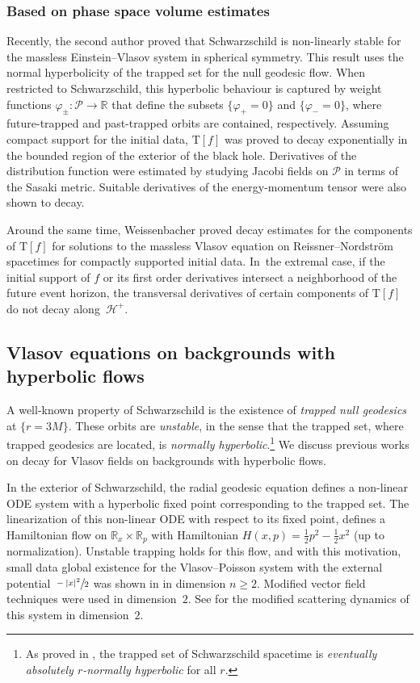 \documentclass[10pt]{amsart}
\theoremstyle{plain}
\theoremstyle{definition}
\newcommand\R{{\mathbb{R}}}
\renewcommand\H{{\mathcal{H}^+}}
\begin{document}
\subsubsection{Based on phase space volume estimates} Recently, the second author \cite{VR23} proved that Schwarzschild is non-linearly stable for the massless Einstein--Vlasov system in spherical symmetry. This result uses the normal hyperbolicity of the trapped set for the null geodesic flow. When restricted to Schwarzschild, this hyperbolic behaviour is captured by weight functions $\varphi_{\pm}\colon \mathcal{P}\to \R$ that define the subsets $\{\varphi_{+}=0\}$ and $\{\varphi_{-}=0\}$, where future-trapped and past-trapped orbits are contained, respectively. Assuming compact support for the initial data, $\mathrm{T}[f]$ was proved to decay exponentially in the bounded region of the exterior of the black hole. Derivatives of the distribution function were estimated by studying Jacobi fields on $\mathcal{P}$ in terms of the Sasaki metric. Suitable derivatives of the energy-momentum tensor were also shown to decay.

Around the same time, Weissenbacher \cite{W23} proved decay estimates for the components of $\mathrm{T}[f]$ for solutions to the massless Vlasov equation on Reissner--Nordström spacetimes for compactly supported initial data. In~the extremal case, if the initial support of $f$ or its first order derivatives intersect a neighborhood of the future event horizon, the transversal derivatives of certain components of $\mathrm{T}[f]$ do not decay along~$\H$.

\subsection{Vlasov equations on backgrounds with hyperbolic flows}

A well-known property of Schwarzschild is the existence of \emph{trapped null geodesics} at $\{r=3M\}$. These orbits are \emph{unstable}, in the sense that the trapped set, where trapped geodesics are located, is \emph{normally hyperbolic}.\footnote{As proved in \cite[\S2]{WZ11}, the trapped set of Schwarzschild spacetime is \textit{eventually absolutely $r$-normally hyperbolic} for all $r$.} We discuss previous works on decay for Vlasov fields on backgrounds with hyperbolic flows.

In the exterior of Schwarzschild, the radial geodesic equation defines a non-linear ODE system with a hyperbolic fixed point corresponding to the trapped set. The linearization of this non-linear ODE with respect to its fixed point, defines a Hamiltonian flow on $\R_x\times \R_p$ with Hamiltonian $H(x,p)=\frac{1}{2}p^2-\frac{1}{2}x^2$ (up to normalization). Unstable trapping holds for this flow, and with this motivation, small data global existence for the Vlasov--Poisson system with the external potential $\sfrac{-|x|^2}{2}$ was shown in \cite{VV24} in dimension $n\geq 2$. Modified vector field techniques were used in dimension~$2$. See \cite{BVV23} for the modified scattering dynamics of this system in dimension~$2$.
\end{document}

